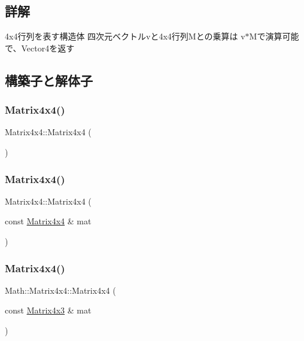 \subsection{詳解}
4x4行列を表す構造体 四次元ベクトルvと4x4行列\+Mとの乗算は v$\ast$\+Mで演算可能で、\+Vector4を返す 

\subsection{構築子と解体子}
\mbox{\label{struct_math_1_1_matrix4x4_a714a467ba7f85f88ebe3897b5e3580be}} 
\subsubsection{\texorpdfstring{Matrix4x4()}{Matrix4x4()}\hspace{0.1cm}{\footnotesize\ttfamily [1/5]}}
{\footnotesize\ttfamily Matrix4x4\+::\+Matrix4x4 (\begin{DoxyParamCaption}{ }\end{DoxyParamCaption})}

\mbox{\label{struct_math_1_1_matrix4x4_affb9606dbdc0c8995cbe544f474e64a4}} 
\subsubsection{\texorpdfstring{Matrix4x4()}{Matrix4x4()}\hspace{0.1cm}{\footnotesize\ttfamily [2/5]}}
{\footnotesize\ttfamily Matrix4x4\+::\+Matrix4x4 (\begin{DoxyParamCaption}\item[{const \mbox{\hyperlink{struct_math_1_1_matrix4x4}{Matrix4x4}} \&}]{mat }\end{DoxyParamCaption})}

\mbox{\label{struct_math_1_1_matrix4x4_a5742d2aa46a5555a89718ee256d24687}} 
\subsubsection{\texorpdfstring{Matrix4x4()}{Matrix4x4()}\hspace{0.1cm}{\footnotesize\ttfamily [3/5]}}
{\footnotesize\ttfamily Math\+::\+Matrix4x4\+::\+Matrix4x4 (\begin{DoxyParamCaption}\item[{const \mbox{\hyperlink{struct_math_1_1_matrix4x3}{Matrix4x3}} \&}]{mat }\end{DoxyParamCaption})}

